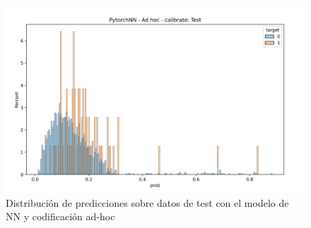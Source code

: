 \begin{figure}[b!]
    \centering
    \includegraphics[width=\linewidth]{figures/results/ad-hoc/nn/calibrate/nn_adhoc_calibrate_test.png}
    \caption{Distribución de predicciones sobre datos de test con el modelo de NN y codificación ad-hoc}
    \label{fig:calibrate-bestmoodel-adhoc-test}
\end{figure}


